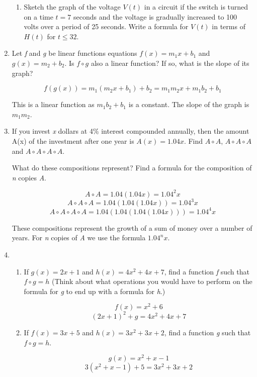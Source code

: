 \documentclass{article}
\begin{document}
\begin{enumerate}
\begin{enumerate}
			\item Sketch the graph of the voltage $V(t)$ in a circuit if the switch is turned on a time $t = 7$ seconds
				and the voltage is gradually increased to 100 volts over a period of 25 seconds. Write a formula
				for $V(t)$ in terms of $H(t)$ for $t \leq 32$.
		\end{enumerate}
		
		\item Let \emph{f} and \emph{g} be linear functions equations $f(x) = m_1x + b_1$ and $g(x) = m_2 + b_2$. Is
			$f \circ g$ also a linear function? If so, what is the slope of its graph?
			
			$$f(g(x)) = m_1(m_2x + b_1) + b_2 = m_1m_2x + m_1b_2 + b_1$$
			
			
			This is a linear function as $m_1b_2 + b_1$ is a constant. The slope of the graph is $m_1m_2$.
			
		\item If you invest \emph{x} dollars at 4\% interest compounded annually, then the amount A(x) of the
			investment after one year is $A(x) = 1.04x$. Find $A \circ A$, $A \circ A \circ A$ and $A \circ A \circ A \circ A$.
			
			 What do these compositions represent? Find a formula for the composition of \emph{n} copies \emph{A}.
			 
			 $$A \circ A = 1.04(1.04x) = 1.04^2x$$
			 $$A \circ A \circ A = 1.04(1.04(1.04x)) = 1.04^3x$$
			 $$A \circ A \circ A \circ A = 1.04(1.04(1.04(1.04x))) = 1.04^4x$$
			 
			These compositions represent the growth of a sum of money over a number of years. For \emph{n} copies
			of \emph{A} we use the formula $1.04^nx$.
			
		\item 
		\begin{enumerate}
		
			\item If $g(x) = 2x + 1$ and $h(x) = 4x^2 + 4x +7$, find a function \emph{f} such that $f \circ g = h$
				(Think about what operations you would have to perform on the formula for \emph{g} to end up
				with a formula for \emph{h}.)
				
				$$f(x) = x^2 + 6$$
				$$(2x + 1)^2 + g = 4x^2 + 4x + 7$$
				
			\item If $f(x) = 3x + 5$ and $h(x) = 3x^2 + 3x + 2$, find a function \emph{g} such that $f \circ g = h$.
			
				$$g(x) = x^2 + x - 1$$
				$$3(x^2 + x - 1) + 5 = 3x^2 + 3x + 2$$
		\end{enumerate}
		

\end{enumerate}
\end{document}
